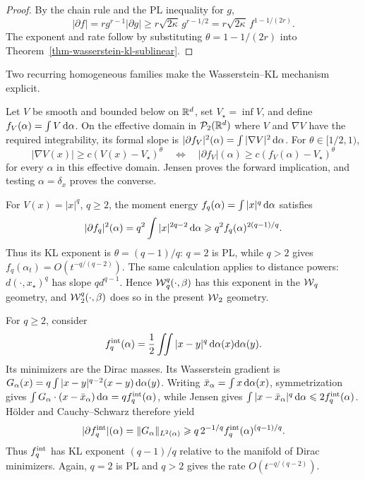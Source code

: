 \begin{proof}
	By the chain rule and the PL inequality for \(g\),
	\[
		|\partial f|
		=
		rg^{r-1}|\partial g|
		\geq
		r\sqrt{2\kappa}\,g^{r-1/2}
		=
		r\sqrt{2\kappa}\,f^{1-1/(2r)}.
	\]
	The exponent and rate follow by substituting \(\theta=1-1/(2r)\) into Theorem~\ref{thm-wasserstein-kl-sublinear}.
\end{proof}

Two recurring homogeneous families make the Wasserstein--KL mechanism explicit.

\begin{rem}\label{ex-homogeneous-wasserstein-kl}
		Let \(V\) be smooth and bounded below on \(\RR^d\), set \(V_\star=\inf V\), and define \(f_V(\alpha)=\int V\,\d\alpha\). On the effective domain in \(\Pp_2(\RR^d)\) where \(V\) and \(\nabla V\) have the required integrability, its formal slope is \(|\partial f_V|^2(\alpha)=\int|\nabla V|^2\,\d\alpha\). For \(\theta\in[1/2,1)\),
	\[
		|\nabla V(x)|\geq c(V(x)-V_\star)^\theta
		\quad\Longleftrightarrow\quad
		|\partial f_V|(\alpha)\geq c(f_V(\alpha)-V_\star)^\theta
	\]
		for every \(\alpha\) in this effective domain. Jensen proves the forward implication, and testing \(\alpha=\delta_x\) proves the converse.

	For \(V(x)=|x|^q\), \(q\geq2\), the moment energy \(f_q(\alpha)=\int|x|^q\,\d\alpha\) satisfies
	\[
		|\partial f_q|^2(\alpha)
		=q^2\int|x|^{2q-2}\,\d\alpha
		\geq q^2 f_q(\alpha)^{2(q-1)/q}.
	\]
	Thus its KL exponent is \(\theta=(q-1)/q\): \(q=2\) is PL, while \(q>2\) gives \(f_q(\alpha_t)=O(t^{-q/(q-2)})\). The same calculation applies to distance powers: \(d(\cdot,x_\star)^q\) has slope \(q d^{q-1}\). Hence \(\Wass_q^q(\cdot,\beta)\) has this exponent in the \(\Wass_q\) geometry, and \(\Wass_2^q(\cdot,\beta)\) does so in the present \(\Wass_2\) geometry.
\end{rem}

\begin{rem}\label{rem-homogeneous-interaction-kl}
	For \(q\geq2\), consider
	\[
		f_q^{\rm int}(\alpha)
		=
		\frac12\iint |x-y|^q\,\d\alpha(x)\d\alpha(y).
	\]
	Its minimizers are the Dirac masses. Its Wasserstein gradient is \(G_\alpha(x)=q\int|x-y|^{q-2}(x-y)\,\d\alpha(y)\). Writing \(\bar x_\alpha=\int x\,\d\alpha(x)\), symmetrization gives \(\int G_\alpha\cdot(x-\bar x_\alpha)\,\d\alpha=qf_q^{\rm int}(\alpha)\), while Jensen gives \(\int|x-\bar x_\alpha|^q\,\d\alpha\leq2f_q^{\rm int}(\alpha)\). H{\"o}lder and Cauchy--Schwarz therefore yield
	\[
		|\partial f_q^{\rm int}|(\alpha)
		=\|G_\alpha\|_{L^2(\alpha)}
		\geq q\,2^{-1/q}f_q^{\rm int}(\alpha)^{(q-1)/q}.
	\]
	Thus \(f_q^{\rm int}\) has KL exponent \((q-1)/q\) relative to the manifold of Dirac minimizers. Again, \(q=2\) is PL and \(q>2\) gives the rate \(O(t^{-q/(q-2)})\).
\end{rem}

